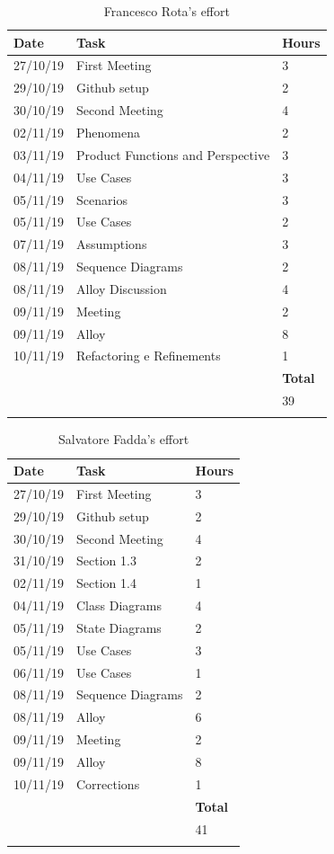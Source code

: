 \documentclass {article}
\begin{document}
\begin{longtable}{| p{2 cm} | p{6 cm} | p{1 cm} |} 
			\hline
			{\bf Date} & {\bf Task} & {\bf Hours}\\
			\hline
			27/10/19 & First Meeting & 3 \\
			\hline
			29/10/19 & Github setup & 2 \\
			\hline
			30/10/19 & Second Meeting & 4 \\
			\hline
			02/11/19 & Phenomena & 2 \\
			\hline
			03/11/19 & Product Functions and Perspective & 3 \\
			\hline
			04/11/19 & Use Cases & 3 \\
			\hline
			05/11/19 & Scenarios & 3 \\
			\hline
			05/11/19 & Use Cases & 2 \\
			\hline
			07/11/19 & Assumptions & 3 \\
			\hline
			08/11/19 & Sequence Diagrams & 2 \\
			\hline
			08/11/19 & Alloy Discussion & 4 \\
			\hline
			09/11/19 & Meeting & 2 \\
			\hline
			09/11/19 & Alloy & 8 \\
			\hline
			10/11/19 & Refactoring e Refinements & 1 \\
			\hline
			& & {\bf Total} \\
			\hline
			& & 39 \\
			\hline
			\caption{Francesco Rota's effort}
\end{longtable}
\pagebreak

\begin{longtable}{| p{2 cm} | p{6 cm} | p{1 cm} |} 
			\hline
			{\bf Date} & {\bf Task} & {\bf Hours}\\
			\hline
			27/10/19 & First Meeting & 3 \\
			\hline
			29/10/19 & Github setup & 2 \\
			\hline
			30/10/19 & Second Meeting & 4 \\
			\hline
			31/10/19 & Section 1.3 & 2 \\
			\hline
			02/11/19 & Section 1.4 & 1 \\
			\hline
			04/11/19 & Class Diagrams & 4 \\
			\hline
			05/11/19 & State Diagrams & 2 \\
			\hline
			05/11/19 & Use Cases & 3 \\
			\hline
			06/11/19 & Use Cases & 1 \\
			\hline
			08/11/19 & Sequence Diagrams & 2 \\
			\hline
			08/11/19 & Alloy & 6 \\
			\hline
			09/11/19 & Meeting & 2 \\
			\hline
			09/11/19 & Alloy & 8 \\
			\hline
			10/11/19 & Corrections & 1 \\
			\hline
			& & {\bf Total} \\
			\hline
			& & 41 \\
			\hline
			\caption{Salvatore Fadda's effort}
\end{longtable}

\pagebreak

	
\end{document}

